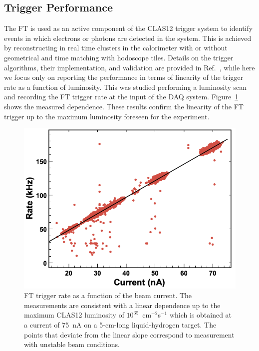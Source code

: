 \subsection{Trigger Performance}

The FT is used as an active component of the CLAS12 trigger system to identify events in which electrons or
photons are detected in the system. This is achieved by reconstructing in real time clusters in the calorimeter with
or without geometrical and time matching with hodoscope tiles. Details on the trigger algorithms, their implementation,
and validation are provided in Ref.~\cite{trigger}, while here we focus only on reporting the performance in terms of
linearity of the trigger rate as a function of luminosity. This was studied performing a luminosity scan and recording
the FT trigger rate at the input of the DAQ system. Figure~\ref{fig:trigger_rate} shows the measured dependence.
These results confirm the linearity of the FT trigger up to the maximum luminosity foreseen for the experiment.

\begin{figure}[h]
\includegraphics[height=0.68\columnwidth]{fig/ft_trigger.png}
\caption{FT trigger rate as a function of the beam current. The measurements are consistent with a linear dependence
  up to the maximum CLAS12 luminosity of $10^{35}$~cm$^{-2}$s$^{-1}$ which is obtained at a current of 75~nA on a
  5-cm-long liquid-hydrogen target. The points that deviate from the linear slope correspond to measurement with
  unstable beam conditions.}
\label{fig:trigger_rate}
\end{figure}


